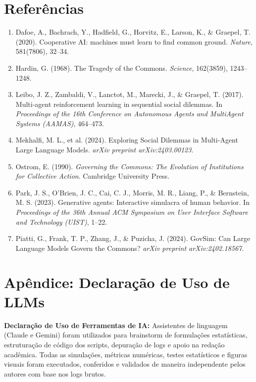 ﻿\documentclass[11pt,a4paper]{article}
\begin{document}
\section*{Referências}
\begin{enumerate}[leftmargin=*,itemsep=2pt]
    \small
    \item Dafoe, A., Bachrach, Y., Hadfield, G., Horvitz, E., Larson, K., \& Graepel, T. (2020). Cooperative AI: machines must learn to find common ground. \textit{Nature}, 581(7806), 32--34.
    \item Hardin, G. (1968). The Tragedy of the Commons. \textit{Science}, 162(3859), 1243--1248.
    \item Leibo, J. Z., Zambaldi, V., Lanctot, M., Marecki, J., \& Graepel, T. (2017). Multi-agent reinforcement learning in sequential social dilemmas. In \textit{Proceedings of the 16th Conference on Autonomous Agents and MultiAgent Systems (AAMAS)}, 464--473.
    \item Mekhalfi, M. L., et al. (2024). Exploring Social Dilemmas in Multi-Agent Large Language Models. \textit{arXiv preprint arXiv:2403.00123}.
    \item Ostrom, E. (1990). \textit{Governing the Commons: The Evolution of Institutions for Collective Action}. Cambridge University Press.
    \item Park, J. S., O'Brien, J. C., Cai, C. J., Morris, M. R., Liang, P., \& Bernstein, M. S. (2023). Generative agents: Interactive simulacra of human behavior. In \textit{Proceedings of the 36th Annual ACM Symposium on User Interface Software and Technology (UIST)}, 1--22.
    \item Piatti, G., Frank, T. P., Zhang, J., \& Puzicha, J. (2024). GovSim: Can Large Language Models Govern the Commons? \textit{arXiv preprint arXiv:2402.18567}.
\end{enumerate}

\section*{Apêndice: Declaração de Uso de LLMs}
\textbf{Declaração de Uso de Ferramentas de IA:} Assistentes de linguagem (Claude e Gemini) foram utilizados para brainstorm de formulações estatísticas, estruturação de código dos scripts, depuração de logs e apoio na redação acadêmica. Todas as simulações, métricas numéricas, testes estatísticos e figuras visuais foram executados, conferidos e validados de maneira independente pelos autores com base nos logs brutos.
\end{document}
